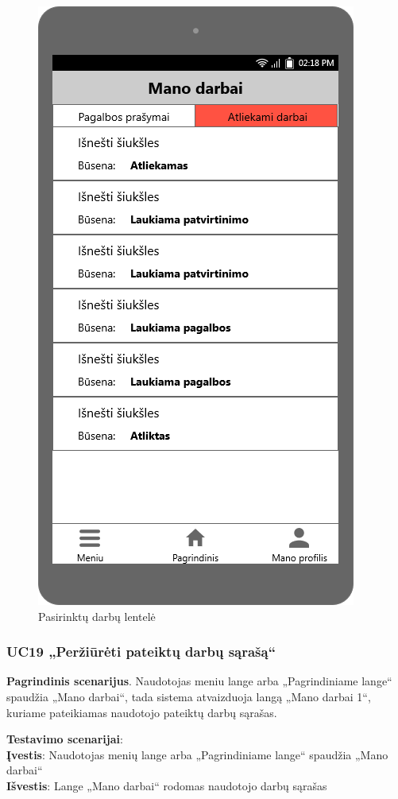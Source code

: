 \documentclass{VUMIFPSbakalaurinis}
\begin{document}
\begin{figure}[H]
	\centering
	\includegraphics[scale=0.4]{img/ScreenShots/05-Mano-darbai1}
	\caption{Pasirinktų darbų lentelė}
	\label{img:requested jobs table}
\end{figure}
\subsubsection{UC19 „Peržiūrėti pateiktų darbų sąrašą“}
\textbf{Pagrindinis scenarijus}. Naudotojas meniu lange arba „Pagrindiniame lange“ spaudžia „Mano darbai“, tada sistema atvaizduoja langą „Mano darbai 1“, kuriame pateikiamas naudotojo pateiktų darbų sąrašas.
\par \textbf{Testavimo scenarijai}:\\
\textbf{Įvestis}:  Naudotojas menių lange arba „Pagrindiniame lange“ spaudžia „Mano darbai“\\
\textbf{Išvestis}: Lange „Mano darbai“ rodomas naudotojo darbų sąrašas\\ \\
\end{document}
